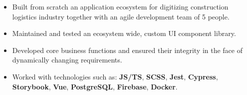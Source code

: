 \documentclass[11pt,a4paper]{altacv}
\begin{document}
 \vspace{7mm}

\begin{fullwidth}
  \makecvheader
\end{fullwidth}


\begin{comment}
\cvsection[page1sidebar]{Summary}
\begin{justify}
I am a senior Computer Science major currently working on my Bachelor Thesis, while  pursuing master's degree in CS well as deepening my experience in web development at a Berlin-based Start-up Kamioni. I complement my skills in software development with strong interest in data science. My aim is to become a cross field expert, who can not only rely on existing solutions, but also creates own ones in order to leverage the company's effectiveness.
\end{justify}
\end{comment}
\begin{itemize}
\item Built from scratch an application ecosystem for digitizing construction logistics industry together with an agile development team of 5 people.
\item Maintained and tested an ecosystem wide, custom UI component library.
\item Developed core business functions and ensured their integrity in the face of dynamically changing requirements. 
\item Worked with technologies such as: \textbf{JS/TS}, \textbf{SCSS}, \textbf{Jest}, \textbf{Cypress}, \textbf{Storybook}, \textbf{Vue}, \textbf{PostgreSQL}, \textbf{Firebase}, \textbf{Docker}.
\end{itemize}
\end{document}
